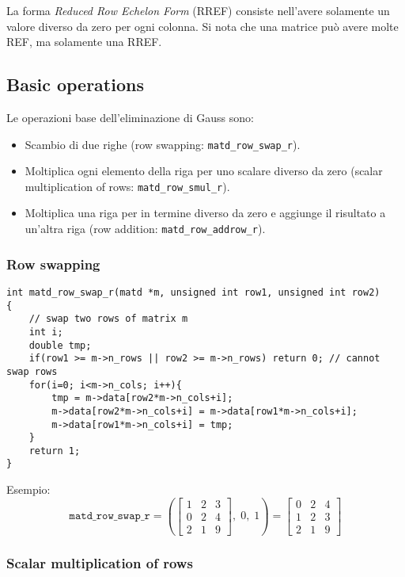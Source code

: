 \documentclass[10pt]{article}
\begin{document}
La forma \textit{Reduced Row Echelon Form} (RREF) consiste nell'avere solamente un valore diverso da zero per ogni colonna.
Si nota che una matrice può avere molte REF, ma solamente una RREF.


\subsection{Basic operations}

Le operazioni base dell'eliminazione di Gauss sono:
\begin{itemize}[noitemsep]
\item Scambio di due righe (row swapping: \verb|matd_row_swap_r|).
\item Moltiplica ogni elemento della riga per uno scalare diverso da zero (scalar multiplication of rows: \verb|matd_row_smul_r|).
\item Moltiplica una riga per in termine diverso da zero e aggiunge il risultato a un'altra riga (row addition: \verb|matd_row_addrow_r|).
\end{itemize}

\subsubsection{Row swapping}

\begin{lstlisting}
int matd_row_swap_r(matd *m, unsigned int row1, unsigned int row2)
{
	// swap two rows of matrix m
	int i;
	double tmp;
	if(row1 >= m->n_rows || row2 >= m->n_rows) return 0; // cannot swap rows
	for(i=0; i<m->n_cols; i++){
		tmp = m->data[row2*m->n_cols+i];
		m->data[row2*m->n_cols+i] = m->data[row1*m->n_cols+i];
		m->data[row1*m->n_cols+i] = tmp;
	}
	return 1;
}
\end{lstlisting}

Esempio:
\begin{equation*}
\mathtt{matd\_row\_swap\_r} = \left( 
\begin{bmatrix}
1 & 2 & 3 \\ 0 & 2 & 4 \\ 2 & 1 & 9
\end{bmatrix}, \; 0, \; 1
\right) = 
\begin{bmatrix}
0 & 2 & 4 \\ 1 & 2 & 3 \\ 2 & 1 & 9
\end{bmatrix}
\end{equation*}

\subsubsection{Scalar multiplication of rows}
\end{document}
